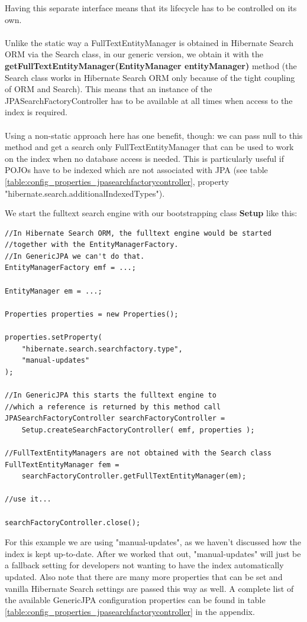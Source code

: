 \noindent
Having this separate interface means that its lifecycle has to be controlled on its own.
\\\\
Unlike the static way a FullTextEntityManager is obtained in Hibernate Search ORM via the Search class, in our generic version, we obtain it with the \textbf{getFullTextEntityManager(EntityManager entityManager)} method (the Search class works in Hibernate Search ORM only because of the tight coupling of ORM and Search). This means that an instance of the JPASearchFactoryController has to be available at all times when access to the index is required.
\\\\
Using a non-static approach here has one benefit, though: we can pass null to this method and get a search only FullTextEntityManager that can be used to work on the index when no database access is needed. This is particularly useful if POJOs have to be indexed which are not associated with JPA (see table \ref{table:config_properties_jpasearchfactorycontroller}, property "hibernate.search.additionalIndexedTypes").

\pagebreak

\noindent
We start the fulltext search engine with our bootstrapping class \textbf{Setup} like this:
\\
\lstset{language=java}
\begin{lstlisting}[frame=htrbl, caption={MassIndexer usage with Hibernate Search ORM}, label={lst:massindexing_hsearch_orm.java}]
//In Hibernate Search ORM, the fulltext engine would be started 
//together with the EntityManagerFactory.
//In GenericJPA we can't do that.
EntityManagerFactory emf = ...;

EntityManager em = ...;

Properties properties = new Properties();

properties.setProperty(
	"hibernate.search.searchfactory.type", 
	"manual-updates"
);

//In GenericJPA this starts the fulltext engine to 
//which a reference is returned by this method call
JPASearchFactoryController searchFactoryController =
	Setup.createSearchFactoryController( emf, properties );

//FullTextEntityManagers are not obtained with the Search class
FullTextEntityManager fem = 
	searchFactoryController.getFullTextEntityManager(em);

//use it...

searchFactoryController.close();
\end{lstlisting}
\noindent
For this example we are using "manual-updates", as we haven't discussed how the index is kept up-to-date. After we worked that out, "manual-updates" will just be a fallback setting for developers not wanting to have the index automatically updated.  Also note that there are many more properties that can be set and vanilla Hibernate Search settings are passed this way as well. A complete list of the available GenericJPA configuration properties can be found in table \ref{table:config_properties_jpasearchfactorycontroller} in the appendix.

